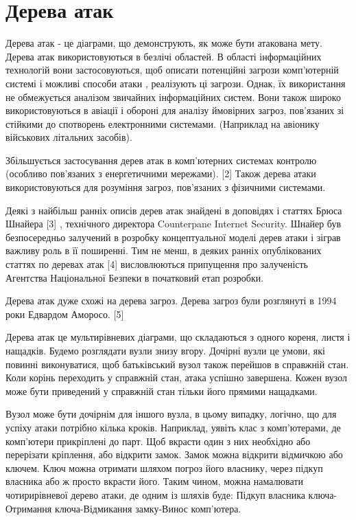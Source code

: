\documentclass[oneside,final,14pt]{extreport}
\begin{document}
\section{Дерева атак}
\label{2section:id14}
Дерева атак - це діаграми, що демонструють, як може бути атакована мету. Дерева атак використовуються в безлічі областей. В області інформаційних технологій вони застосовуються, щоб описати потенційні загрози комп'ютерній системі і можливі способи атаки , реалізують ці загрози. Однак, їх використання не обмежується аналізом звичайних інформаційних систем. Вони також широко використовуються в авіації і обороні для аналізу ймовірних загроз, пов'язаних зі стійкими до спотворень електронними системами. (Наприклад на авіонику військових літальних засобів).

Збільшується застосування дерев атак в комп'ютерних системах контролю (особливо пов'язаних з енергетичними мережами). {[}2{]} Також дерева атаки використовуються для розуміння загроз, пов'язаних з фізичними системами.

Деякі з найбільш ранніх описів дерев атак знайдені в доповідях і статтях Брюса Шнайера {[}3{]} , технічного директора Counterpane Internet Security. Шнайер був безпосередньо залучений в розробку концептуальної моделі дерев атаки і зіграв важливу роль в її поширенні. Тим не менш, в деяких ранніх опублікованих статтях по деревах атак {[}4{]} висловлюються припущення про залученість Агентства Національної Безпеки в початковий етап розробки.

Дерева атак дуже схожі на дерева загроз. Дерева загроз були розглянуті в 1994 роки Едвардом Аморосо. {[}5{]}

Дерева атак це мультирівневих діаграми, що складаються з одного кореня, листя і нащадків. Будемо розглядати вузли знизу вгору. Дочірні вузли це умови, які повинні виконуватися, щоб батьківський вузол також перейшов в справжній стан. Коли корінь переходить у справжній стан, атака успішно завершена. Кожен вузол може бути приведений у справжній стан тільки його прямими нащадками.

Вузол може бути дочірнім для іншого вузла, в цьому випадку, логічно, що для успіху атаки потрібно кілька кроків. Наприклад, уявіть клас з комп'ютерами, де комп'ютери прикріплені до парт. Щоб вкрасти один з них необхідно або перерізати кріплення, або відкрити замок. Замок можна відкрити відмичкою або ключем. Ключ можна отримати шляхом погроз його власнику, через підкуп власника або ж просто вкрасти його. Таким чином, можна намалювати чотирирівневої дерево атаки, де одним із шляхів буде: Підкуп власника ключа-Отримання ключа-Відмикання замку-Винос комп'ютера.
\end{document}
